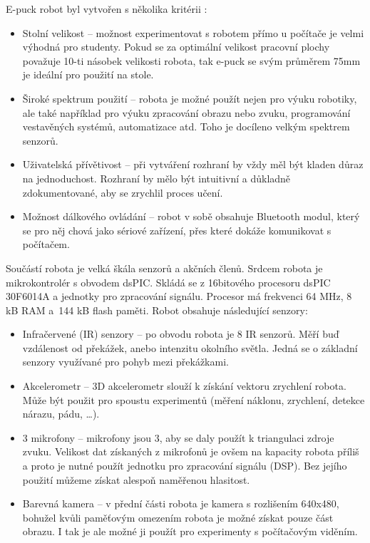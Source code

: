     E-puck robot byl vytvořen s několika kritérii \cite{bonani}:
    \begin{itemize}
        \item Stolní velikost -- možnost experimentovat s robotem přímo u
        počítače je velmi výhodná pro studenty. Pokud se za optimální velikost
        pracovní plochy považuje 10-ti násobek velikosti robota, tak e-puck se
        svým průměrem 75mm je ideální pro použití na stole.

        \item Široké spektrum použití -- robota je možné použít nejen pro výuku
        robotiky, ale také například pro výuku zpracování obrazu nebo zvuku,
        programování vestavěných systémů, automatizace atd. Toho je docíleno
        velkým spektrem senzorů.

        \item Uživatelská přívětivost -- při vytváření rozhraní by vždy měl být
        kladen důraz na jednoduchost. Rozhraní by mělo být intuitivní a
        důkladně zdokumentované, aby se zrychlil proces učení.

        \item Možnost dálkového ovládání -- robot v sobě obsahuje Bluetooth
        modul, který se pro něj chová jako sériové zařízení, přes které dokáže
        komunikovat s počítačem.
    \end{itemize}

    Součástí robota je velká škála senzorů a akčních členů. Srdcem robota je
    mikrokontrolér s obvodem dsPIC. Skládá se z 16bitového procesoru dsPIC
    30F6014A a jednotky pro zpracování signálu. Procesor má frekvenci 64 MHz, 8
    kB RAM a~144 kB flash paměti. Robot obsahuje následující senzory:

    \begin{itemize}
        \item Infračervené (IR) senzory -- po obvodu robota je 8 IR senzorů. Měří
        buď vzdálenost od překážek, anebo intenzitu okolního světla. Jedná se o
        základní senzory využívané pro pohyb mezi překážkami.

        \item Akcelerometr -- 3D akcelerometr slouží k získání vektoru
        zrychlení robota. Může být použit pro spoustu experimentů (měření
        náklonu, zrychlení, detekce nárazu, pádu, \ldots).

        \item 3 mikrofony -- mikrofony jsou 3, aby se daly použít k triangulaci
        zdroje zvuku. Velikost dat získaných z mikrofonů je ovšem na kapacity
        robota příliš a proto je nutné použít jednotku pro zpracování signálu
        (DSP). Bez jejího použití můžeme získat alespoň naměřenou hlasitost.

        \item Barevná kamera -- v přední části robota je kamera s rozlišením
        640x480, bohužel kvůli paměťovým omezením robota je možné získat pouze
        část obrazu. I tak je ale možné ji použít pro experimenty s počítačovým
        viděním.
    \end{itemize}

